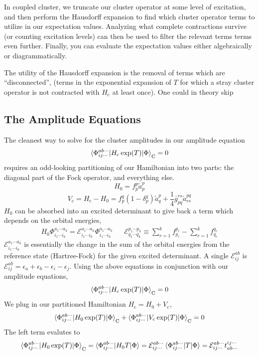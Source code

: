 \documentclass{article}
\newcommand{\cd}{\cdots}
\newcommand{\Vc}{V_{\mathrm{c}}}
\newcommand{\Hc}{H_{\mathrm{c}}}
\begin{document}
In coupled cluster, we truncate our cluster operator at some level of excitation,
and then perform the Hausdorff expansion to find which cluster operator terms
to utilize in our expectation values. Analyzing what complete contractions survive 
(or counting excitation levels) can then be used to filter the relevant terms terms even
further. Finally, you can evaluate the expectation values either 
    algebraically or diagrammatically.

The utility of the Hausdorff expansion is the removal of terms which are ``disconnected'',
(terms in the exponential expansion of $T$ for which a stray cluster operator is not contracted with $\Hc$ at least once).
One could in theory skip 

\subsection{The Amplitude Equations}
The cleanest way to solve for the cluster amplitudes 
in our amplitude equation 
\[\braket{ \Phi_{i j \cdots }^{a b \cdots} |\Hc \exp(T) | \Phi}_\mathrm{C} = 0\]
requires an odd-looking partitioning of our Hamiltonian 
into two parts: the diagonal part of the Fock operator, and everything else. 
\[H_0 = f_p^p \tilde{a}_p^p \]
\[\Vc = \Hc - H_0 = f_p^q (1 - \delta_p^q) \tilde{a}_q^p + \frac{1}{4} \bar{g}_{pq}^{rs}
 \tilde{a}_{rs}^{pq} \]
$H_0$ can be absorbed into an excited determinant to give back
a term which depends on the orbital energies,
\begin{align}
  H_0\Phi_{i_1\cd i_k}^{a_1\cd a_k}
=
  \mathcal{E}_{i_1\cd i_k}^{a_1\cd a_k}
  \Phi_{i_1\cd i_k}^{a_1\cd a_k}
&&
  \mathcal{E}_{q_1\cd q_k}^{p_1\cd p_k}
\equiv
  \sum_{r=1}^k
  f_{p_r}^{p_r}
-
  \sum_{r=1}^k
  f_{q_r}^{q_r}
\end{align}
$\mathcal{E}_{i_1\cd i_k}^{a_1\cd a_k}$ is essentially the change 
in the sum of the orbital energies from the reference state (Hartree-Fock) for the given 
excited determinant. A single  
$\mathcal{E}_{ij}^{ab}$ is $\mathcal{E}_{ij}^{ab} = \epsilon_a + \epsilon_b - \epsilon_i - \epsilon_j$. 
Using the above equations in conjunction with our amplitude equations,
\[\braket{ \Phi_{i j \cdots }^{a b \cdots} |\Hc \exp(T) | \Phi}_\mathrm{C} 
   =  0  \]
We plug in our partitioned Hamiltonian $\Hc = H_0 + \Vc$,
\[\braket{ \Phi_{i j \cdots }^{a b \cdots} |H_0 \exp(T) | \Phi}_\mathrm{C} 
 + \braket{ \Phi_{i j \cdots }^{a b \cdots} |\Vc \exp(T) | \Phi}_\mathrm{C}
   =  0  \]
The left term evalutes to 
\[ \braket{ \Phi_{i j \cdots }^{a b \cdots} |H_0 \exp(T) | \Phi}_\mathrm{C} = 
   \braket{ \Phi_{i j \cdots }^{a b \cdots} |H_0 T | \Phi} = 
\mathcal{E}_{ij \cd}^{ab \cd} \braket{\Phi_{i j \cdots }^{a b \cdots} |T|\Phi} =
\mathcal{E}_{ij \cd}^{ab \cd} t_{ab \cd}^{ij \cd} \]
\end{document}
